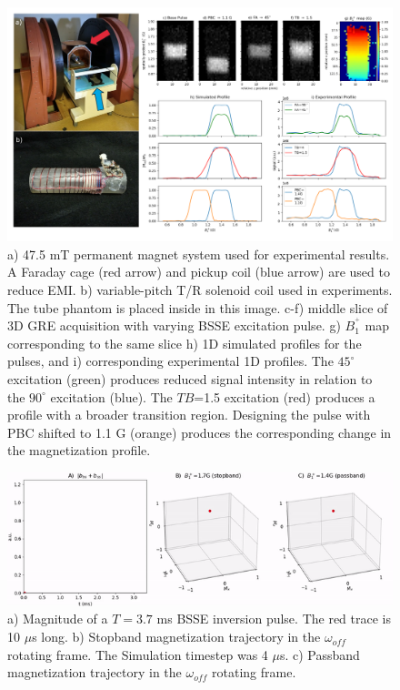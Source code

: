 \begin{figure}[h]
\centering
\includegraphics[width=1.1\textwidth]{figures/experimental_2D_processed_Rev2.png}
\caption{a) 47.5 mT permanent magnet system used for experimental results. A Faraday cage (red arrow) and pickup coil (blue arrow) are used to reduce EMI. b) variable-pitch T/R solenoid coil used in experiments. The tube phantom is placed inside in this image. c-f) middle slice of 3D GRE acquisition with varying BSSE excitation pulse. g) $B_1^^+$ map corresponding to the same slice h) 1D simulated profiles for the pulses, and i) corresponding experimental 1D profiles. The $45^\circ$ excitation (green) produces reduced signal intensity in relation to the $90^\circ$ excitation (blue). The $TB$=1.5 excitation (red) produces a profile with a broader transition region. Designing the pulse with PBC shifted to 1.1 G (orange) produces the corresponding change in the magnetization profile. 
}
\label{fig:exp}
\end{figure}

\renewcommand{\figurename}{Supporting Information Figure}
\renewcommand\thefigure{S\arabic{figure}}
\setcounter{figure}{0}


\begin{figure}[h]
\centering
\includegraphics[width=1.1\textwidth]{figures/magmotion_appendix.gif}
\caption{ a) Magnitude of a $T = 3.7$ ms BSSE inversion pulse. 
The red trace is 10 $\mu$s long. 
b) Stopband magnetization trajectory in the $\omega_{off}$ rotating frame. 
The Simulation timestep was 4 $\mu$s.
c) Passband magnetization trajectory in the $\omega_{off}$ rotating frame.}
\label{fig:magmotion_animated}
\end{figure}
